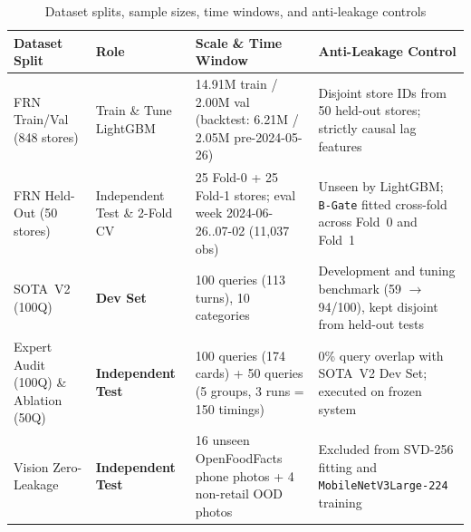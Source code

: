 \begin{table}[H]
\centering
\caption{Dataset splits, sample sizes, time windows, and anti-leakage controls}
\label{tab:split_protocol}
\footnotesize
\begin{tabularx}{\textwidth}{L{2.8cm} L{2.4cm} L{3.6cm} Y}
\toprule
\textbf{Dataset Split} & \textbf{Role} & \textbf{Scale \& Time Window} & \textbf{Anti-Leakage Control} \\
\midrule
FRN Train/Val (848 stores) & Train \& Tune LightGBM & 14.91M train / 2.00M val (backtest: 6.21M / 2.05M pre-2024-05-26) & Disjoint store IDs from 50 held-out stores; strictly causal lag features \\
FRN Held-Out (50 stores) & Independent Test \& 2-Fold CV & 25 Fold-0 + 25 Fold-1 stores; eval week 2024-06-26..07-02 (11,037 obs) & Unseen by LightGBM; \texttt{B-Gate} fitted cross-fold across Fold~0 and Fold~1 \\
SOTA~V2 (100Q) & \textbf{Dev Set} & 100 queries (113 turns), 10 categories & Development and tuning benchmark (59 $\to$ 94/100), kept disjoint from held-out tests \\
Expert Audit (100Q) \& Ablation (50Q) & \textbf{Independent Test} & 100 queries (174 cards) + 50 queries (5 groups, 3 runs = 150 timings) & 0\% query overlap with SOTA~V2 Dev Set; executed on frozen system \\
Vision Zero-Leakage & \textbf{Independent Test} & 16 unseen OpenFoodFacts phone photos + 4 non-retail OOD photos & Excluded from SVD-256 fitting and \texttt{MobileNetV3Large-224} training \\
\bottomrule
\end{tabularx}
\end{table}
